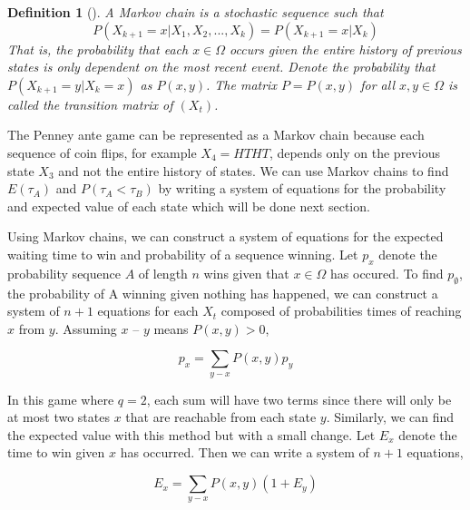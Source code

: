 \documentclass{article}
\newtheorem{definition}[theorem]{Definition}
\numberwithin{mytheorem}{subsection} %
\begin{document}
		\begin{definition}[\cite{textbook}]
			A {\em Markov chain} is a stochastic sequence such that
			$$P(X_{k+1} = x | X_1, X_2, ..., X_k) = P(X_{k+1} = x  | X_k)$$
			That is, the probability that each $x \in \Omega$ occurs given the entire history of
			previous states is only dependent on the most recent event. Denote the probability
			that $P(X_{k+1}=y|X_k=x)$ as $P(x,y)$. The matrix $P = P(x,y)$ for all $x,y \in \Omega$ is called the transition matrix of $(X_t)$.
		\end{definition}

		The Penney ante game can be represented as a Markov chain because each sequence of coin flips, for example $X_4=HTHT$, depends only on the previous state $X_3$ and not the entire history of states. We can use Markov chains to find $E(\tau_A)$ and $P(\tau_A < \tau_B)$ by writing a system of equations for the probability and expected value of each state which will be done next section. 


		Using Markov chains, we can construct a system of equations for the expected waiting time to win and probability of a sequence winning. Let $p_{x}$ denote the probability sequence $A$ of length $n$ wins given that $x\in\Omega$ has occured. To find $p_\emptyset$, the probability of A winning given nothing has happened, we can construct a system of $n+1$ equations for each $X_t$ composed of probabilities times of reaching $x$ from $y$. Assuming $x$ -- $y$ means $P(x,y) > 0$,

		$$p_x = \sum_{y - x} P(x,y) p_y$$

		In this game where $q=2$, each sum will have two terms since there will only be at most two states $x$ that are reachable from each state $y$. Similarly, we can find the expected value with this method but with a small change. Let $E_x$ denote the time to win given $x$ has occurred. Then we can write a system of $n+1$ equations,

		$$E_x = \sum_{y - x} P(x,y) (1 + E_y)$$

\end{document}
